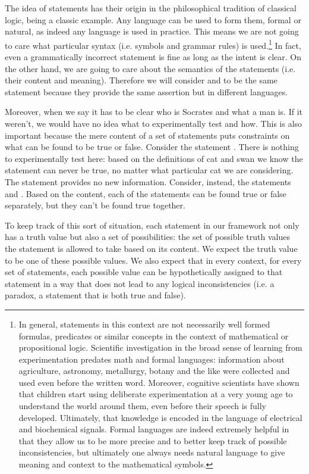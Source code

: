 \documentclass[11pt,letterpaper,fleqn]{memoir} %
\begin{document}
The idea of statements has their origin in the philosophical tradition of classical logic,  being a classic example. Any language can be used to form them, formal or natural, as indeed any language is used in practice. This means we are not going to care what particular syntax (i.e. symbols and grammar rules) is used.\footnote{In general, statements in this context are not necessarily well formed formulas, predicates or similar concepts in the context of mathematical or propositional logic. Scientific investigation in the broad sense of learning from experimentation predates math and formal languages: information about agriculture, astronomy, metallurgy, botany and the like were collected and used even before the written word. Moreover, cognitive scientists have shown that children start using deliberate experimentation at a very young age to understand the world around them, even before their speech is fully developed. Ultimately, that knowledge is encoded in the language of electrical and biochemical signals. Formal languages are indeed extremely helpful in that they allow us to be more precise and to better keep track of possible inconsistencies, but ultimately one always needs natural language to give meaning and context to the mathematical symbols.} In fact, even a grammatically incorrect statement is fine as long as the intent is clear. On the other hand, we are going to care about the semantics of the statements (i.e. their content and meaning). Therefore we will consider  and  to be the same statement because they provide the same assertion but in different languages.

Moreover, when we say  it has to be clear who is Socrates and what a man is. If it weren't, we would have no idea what to experimentally test and how. This is also important because the mere content of a set of statements puts constraints on what can be found to be true or false. Consider the statement . There is nothing to experimentally test here: based on the definitions of cat and swan we know the statement can never be true, no matter what particular cat we are considering. The statement provides no new information. Consider, instead, the statements  and . Based on the content, each of the statements can be found true or false separately, but they can't be found true together.

To keep track of this sort of situation, each statement in our framework not only has a truth value but also a set of possibilities: the set of possible truth values the statement is allowed to take based on its content. We expect the truth value to be one of these possible values. We also expect that in every context, for every set of statements, each possible value can be hypothetically assigned to that statement in a way that does not lead to any logical inconsistencies (i.e. a paradox, a statement that is both true and false).
\end{document}
